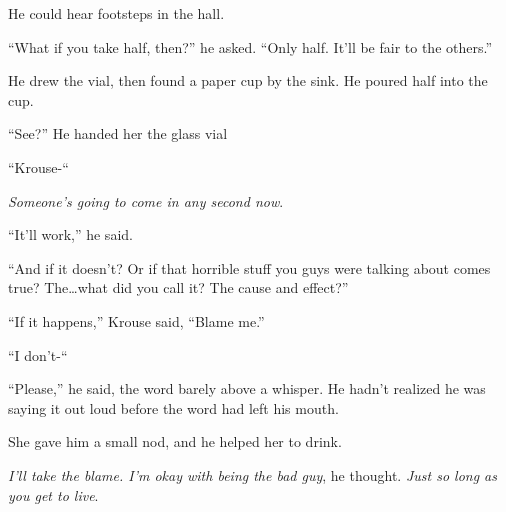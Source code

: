 He could hear footsteps in the hall.



``What if you take half, then?'' he asked.  ``Only half.  It'll be fair to the others.''



He drew the vial, then found a paper cup by the sink.  He poured half into the cup.



``See?''  He handed her the glass vial



``Krouse-``



\emph{Someone's going to come in any second now}.



``It'll work,'' he said.



``And if it doesn't?  Or if that horrible stuff you guys were talking about comes true?  The\ldots what did you call it?  The cause and effect?''



``If it happens,'' Krouse said, ``Blame me.''



``I don't-``



``Please,'' he said, the word barely above a whisper.  He hadn't realized he was saying it out loud before the word had left his mouth.



She gave him a small nod, and he helped her to drink.



\emph{I'll take the blame.  I'm okay with being the bad guy}, he thought.  \emph{Just so long as you get to live}.





